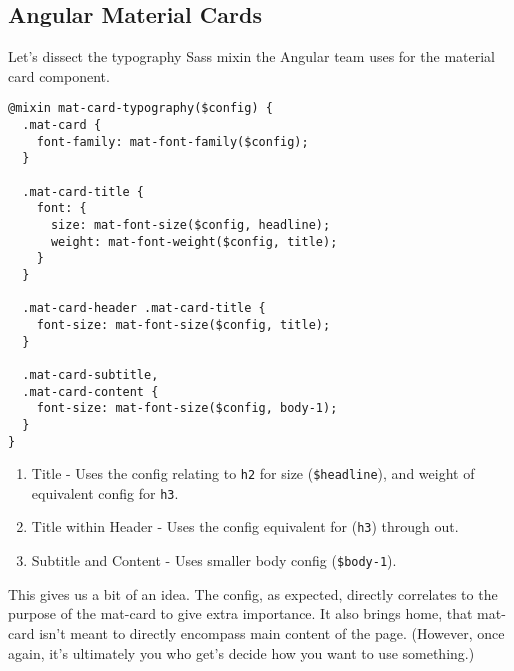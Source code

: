 \subsection{Angular Material Cards}
Let's dissect the typography Sass mixin the Angular team uses for the material card
component. 
\begin{lstlisting}[caption=@angular/material/\_theming.scss]
@mixin mat-card-typography($config) {
  .mat-card {
    font-family: mat-font-family($config);
  }

  .mat-card-title {
    font: {
      size: mat-font-size($config, headline);
      weight: mat-font-weight($config, title);
    }
  }

  .mat-card-header .mat-card-title {
    font-size: mat-font-size($config, title);
  }

  .mat-card-subtitle,
  .mat-card-content {
    font-size: mat-font-size($config, body-1);
  }
}
\end{lstlisting}

\begin{enumerate}
  \item Title - Uses the config relating to \lstinline{h2} for size
  (\lstinline{$headline}), and weight of equivalent config for \lstinline{h3}.
  \item Title within Header - Uses the config equivalent for (\lstinline{h3}) 
  through out.
  \item Subtitle and Content - Uses smaller body config (\lstinline{$body-1}).
\end{enumerate}

This gives us a bit of an idea. The config, as expected, directly correlates to 
the purpose of the mat-card to give extra importance. It also brings home, that
mat-card isn't meant to directly encompass main content of the page. (However,
once again, it's ultimately you who get's decide how you want to use something.)


